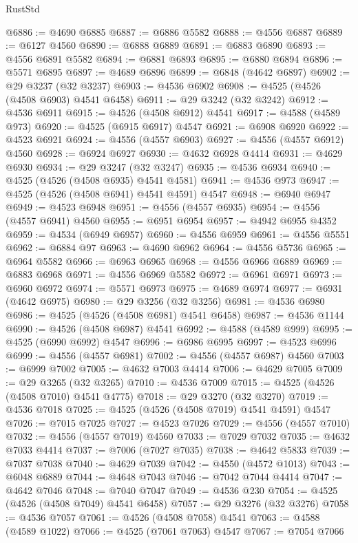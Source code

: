 \begin{lexlean}{RustStd}
\begin{coremodule}
@6886 := @4690 @6885
@6887 := @6886 @5582
@6888 := @4556 @6887
@6889 := @6127 @4560
@6890 := @6888 @6889
@6891 := @6883 @6890
@6893 := @4556 @6891 @5582
@6894 := @6881 @6893
@6895 := @6880 @6894
@6896 := @5571 @6895
@6897 := @4689 @6896
@6899 := @6848 (@4642 @6897)
@6902 := @29 @3237 (@32 @3237)
@6903 := @4536 @6902
@6908 := @4525 (@4526 (@4508 @6903) @4541 @6458)
@6911 := @29 @3242 (@32 @3242)
@6912 := @4536 @6911
@6915 := @4526 (@4508 @6912) @4541
@6917 := @4588 (@4589 @973)
@6920 := @4525 (@6915 @6917) @4547
@6921 := @6908 @6920
@6922 := @4523 @6921
@6924 := @4556 (@4557 @6903)
@6927 := @4556 (@4557 @6912) @4560
@6928 := @6924 @6927
@6930 := @4632 @6928 @4414
@6931 := @4629 @6930
@6934 := @29 @3247 (@32 @3247)
@6935 := @4536 @6934
@6940 := @4525 (@4526 (@4508 @6935) @4541 @4581)
@6941 := @4536 @973
@6947 := @4525 (@4526 (@4508 @6941) @4541 @4591) @4547
@6948 := @6940 @6947
@6949 := @4523 @6948
@6951 := @4556 (@4557 @6935)
@6954 := @4556 (@4557 @6941) @4560
@6955 := @6951 @6954
@6957 := @4942 @6955 @4352
@6959 := @4534 (@6949 @6957)
@6960 := @4556 @6959
@6961 := @4556 @5551
@6962 := @6884 @97
@6963 := @4690 @6962
@6964 := @4556 @5736
@6965 := @6964 @5582
@6966 := @6963 @6965
@6968 := @4556 @6966 @6889
@6969 := @6883 @6968
@6971 := @4556 @6969 @5582
@6972 := @6961 @6971
@6973 := @6960 @6972
@6974 := @5571 @6973
@6975 := @4689 @6974
@6977 := @6931 (@4642 @6975)
@6980 := @29 @3256 (@32 @3256)
@6981 := @4536 @6980
@6986 := @4525 (@4526 (@4508 @6981) @4541 @6458)
@6987 := @4536 @1144
@6990 := @4526 (@4508 @6987) @4541
@6992 := @4588 (@4589 @999)
@6995 := @4525 (@6990 @6992) @4547
@6996 := @6986 @6995
@6997 := @4523 @6996
@6999 := @4556 (@4557 @6981)
@7002 := @4556 (@4557 @6987) @4560
@7003 := @6999 @7002
@7005 := @4632 @7003 @4414
@7006 := @4629 @7005
@7009 := @29 @3265 (@32 @3265)
@7010 := @4536 @7009
@7015 := @4525 (@4526 (@4508 @7010) @4541 @4775)
@7018 := @29 @3270 (@32 @3270)
@7019 := @4536 @7018
@7025 := @4525 (@4526 (@4508 @7019) @4541 @4591) @4547
@7026 := @7015 @7025
@7027 := @4523 @7026
@7029 := @4556 (@4557 @7010)
@7032 := @4556 (@4557 @7019) @4560
@7033 := @7029 @7032
@7035 := @4632 @7033 @4414
@7037 := @7006 (@7027 @7035)
@7038 := @4642 @5833
@7039 := @7037 @7038
@7040 := @4629 @7039
@7042 := @4550 (@4572 @1013)
@7043 := @6048 @6889
@7044 := @4648 @7043
@7046 := @7042 @7044 @4414
@7047 := @4642 @7046
@7048 := @7040 @7047
@7049 := @4536 @230
@7054 := @4525 (@4526 (@4508 @7049) @4541 @6458)
@7057 := @29 @3276 (@32 @3276)
@7058 := @4536 @7057
@7061 := @4526 (@4508 @7058) @4541
@7063 := @4588 (@4589 @1022)
@7066 := @4525 (@7061 @7063) @4547
@7067 := @7054 @7066

\end{coremodule}
\end{lexlean}
